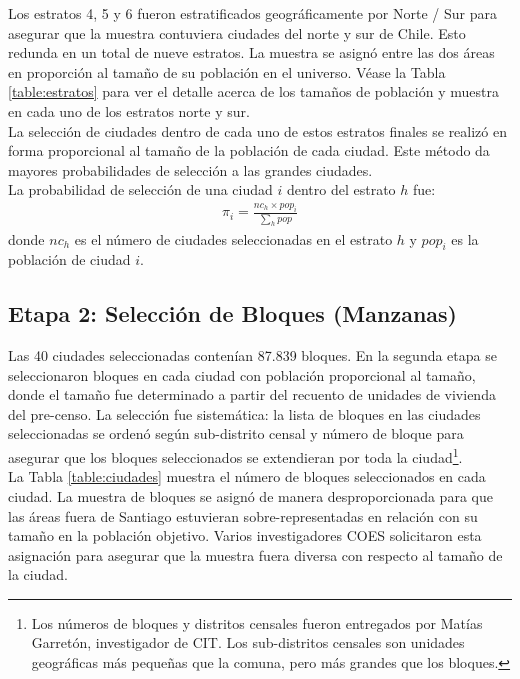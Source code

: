 \documentclass[12pt]{report}
\begin{document}
Los estratos 4, 5 y 6 fueron estratificados geográficamente por Norte / Sur para asegurar que la muestra contuviera ciudades del norte y sur de Chile. Esto redunda en un total de nueve estratos. La muestra se asignó entre las dos áreas en proporción al tamaño de su población en el universo. Véase la Tabla \ref{table:estratos} para ver el detalle acerca de los tamaños de población y muestra en cada uno de los estratos norte y sur.\\

La selección de ciudades dentro de cada uno de estos estratos finales se realizó en forma proporcional al tamaño de la población de cada ciudad. Este método da mayores probabilidades de selección a las grandes ciudades.\\ %

La probabilidad de selección de una ciudad $i$ dentro del estrato $h$ fue:
\begin{eqnarray*}
	\pi_{i} = \frac{nc_h \times pop_i}{\sum_h pop}
\end{eqnarray*} 
donde $nc_h$ es el número de ciudades seleccionadas en el estrato $h$ y $pop_i$ es la población de ciudad $i$.\\


\subsection*{Etapa 2: Selección de Bloques (Manzanas)}

Las 40 ciudades seleccionadas contenían 87.839 bloques. En la segunda etapa se seleccionaron bloques en cada ciudad con población proporcional al tamaño, donde el tamaño fue determinado a partir del recuento de unidades de vivienda del pre-censo. La selección fue sistemática: la lista de bloques en las ciudades seleccionadas se ordenó según sub-distrito censal y número de bloque para asegurar que los bloques seleccionados se extendieran por toda la ciudad\footnote{Los números de bloques y distritos censales fueron entregados por Matías Garretón, investigador de CIT. Los sub-distritos censales son unidades geográficas más pequeñas que la comuna, pero más grandes que los bloques.}.\\

La Tabla \ref{table:ciudades} muestra el número de bloques seleccionados en cada ciudad. La muestra de bloques se asignó de manera desproporcionada para que las áreas fuera de Santiago estuvieran sobre-representadas en relación con su tamaño en la población objetivo. Varios investigadores COES solicitaron esta asignación para asegurar que la muestra fuera diversa con respecto al tamaño de la ciudad.\\
\end{document}
